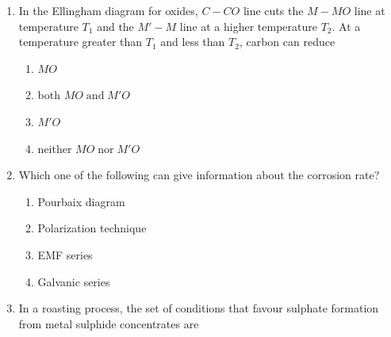 \documentclass[journal]{IEEEtran}
\theoremstyle{remark}
\begin{document}
\begin{enumerate}
\begin{multicols}{4}
\begin{enumerate}
    \item $-\frac{1}{p}(\frac{\partial V}{\partial p})_T$
    \item $\frac{1}{p}(\frac{\partial V}{\partial p})_T$
    \item$-\frac{1}{V}(\frac{\partial V}{\partial p})_T$
    \item $\frac{1}{V}(\frac{\partial V}{\partial p})_T$
\end{enumerate}
\end{multicols}
\item In the Ellingham diagram for oxides, $C-CO$ line cuts the $M-MO$ line at temperature $T_1$ and the $M'-M$ line at a higher temperature $T_2$. At a temperature greater than $T_1$ and less than $T_2$, carbon
can reduce\\
\hfill{}
\begin{multicols}{2}
\begin{enumerate}
    \item $MO$
    \item both $MO\; \text{and} \; M'O$
    \item $M'O$
    \item neither $MO\; \text{nor} \;M'O$ 
\end{enumerate}
    
\end{multicols}


\item Which one of the following can give information about the corrosion rate?\hfill{}

\begin{multicols}{2}
\begin{enumerate}
\item Pourbaix diagram 
\item Polarization technique 
\item EMF series 
\item  Galvanic series 
\end{enumerate}
\end{multicols}

\item In a roasting process, the set of conditions that favour sulphate formation from metal sulphide concentrates are 
\begin{enumerate}[label=\Alph*), start=16]


\end{enumerate}
\end{enumerate}
\end{document}
